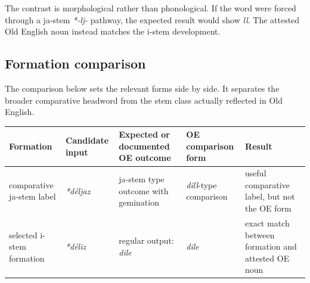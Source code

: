 \documentclass[
  british,
  a4paper,
  openany]{book}
\newcounter{none} %
\begin{document}
The contrast is morphological rather than phonological. If the word were
forced through a ja-stem \emph{*-lj-} pathway, the expected result would
show \emph{ll}. The attested Old English noun instead matches the i-stem
development.

\subsection{Formation comparison}\label{formation-comparison-1}

The comparison below sets the relevant forms side by side. It separates
the broader comparative headword from the stem class actually reflected
in Old English.

{\def\LTcaptype{none} %
\begin{longtable}[]{@{}
  >{\raggedright\arraybackslash}p{}
  >{\raggedright\arraybackslash}p{}
  >{\raggedright\arraybackslash}p{}
  >{\raggedright\arraybackslash}p{}
  >{\raggedright\arraybackslash}p{}@{}}
\toprule\noalign{}
\begin{minipage}[b]{\linewidth}\raggedright
Formation
\end{minipage} & \begin{minipage}[b]{\linewidth}\raggedright
Candidate input
\end{minipage} & \begin{minipage}[b]{\linewidth}\raggedright
Expected or documented OE outcome
\end{minipage} & \begin{minipage}[b]{\linewidth}\raggedright
OE comparison form
\end{minipage} & \begin{minipage}[b]{\linewidth}\raggedright
Result
\end{minipage} \\
\midrule\noalign{}
\endhead
\bottomrule\noalign{}
\endlastfoot
comparative ja-stem label & {\emph{*déljaz}} & ja-stem type outcome with
gemination & {\emph{dill}}-type comparison & useful comparative label,
but not the OE form \\
selected i-stem formation & {\emph{*déliz}} & regular output:
{\emph{dile}} & {\emph{dile}} & exact match between formation and
attested OE noun \\
\end{longtable}
}
\end{document}
